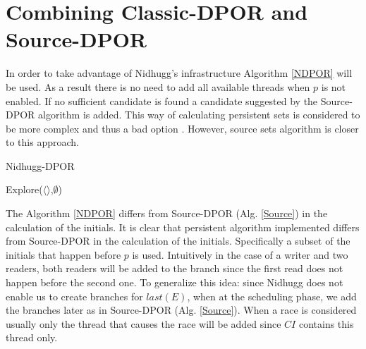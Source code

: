 \section{Combining Classic-DPOR and Source-DPOR}

In order to take advantage of Nidhugg's infrastructure Algorithm \ref{NDPOR} will be used. As a result there is no need to add all
available threads when $p$ is not enabled. If no sufficient candidate is found
a candidate suggested by the Source-DPOR algorithm is added. This way of calculating persistent sets is considered to be more 
complex and thus a bad option \cite{Gode05}. However, source sets algorithm is closer to this approach.

\begin{algorithm}
    \caption{Nidhugg-DPOR}
    \label{NDPOR}
    Explore($\langle \rangle$,$\emptyset$)\;
\end{algorithm}

The Algorithm \ref{NDPOR} differs from Source-DPOR (Alg. \ref{Source}) in the calculation of the initials.
It is clear that persistent algorithm implemented differs from Source-DPOR in the calculation of the initials. 
Specifically a subset of the initials that happen before $p$ is used. 
Intuitively in the case of a writer and two readers, both readers will be added to the branch since the first read does not
happen before the second one.
To generalize this idea: since Nidhugg does not enable us to create branches for $last(E)$, when at the scheduling phase, we add the 
branches later as in Source-DPOR (Alg. \ref{Source}). When a race is considered usually only the thread that causes the race will be added since 
$CI$ contains this thread only.

